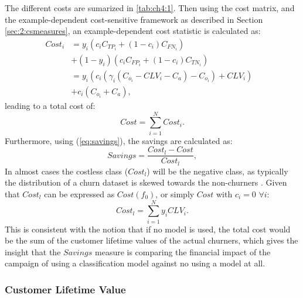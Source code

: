 The different costs are sumarized in \tablename{ \ref{tab:ch4:1}}.	Then using the cost 
matrix, and the example-dependent cost-sensitive framework as described in Section 
\ref{sec:2:csmeasures}, an example-dependent cost statistic is calculated as:
\begin{align}
  Cost_i &= y_i(c_i C_{TP_i} + (1-c_i)C_{FN_i})& \nonumber \\
         &  + (1-y_i)(c_i C_{FP_i} + (1-c_i)C_{TN_i})& \nonumber \\
         &= y_i(c_i\left(\gamma_i(C_{o_i}-CLV_i-C_a)-C_{o_i}\right)+CLV_i)&\nonumber \\
         & +c_i(C_{o_i}+C_a),&
	\end{align}
leading to a total cost of:
\begin{equation}
    Cost = \sum_{i=1}^N Cost_i.
\end{equation}
Furthermore, using (\ref{eq:savings}), the savings are calculated as:
\begin{equation}
  Savings = \frac{Cost_l - Cost}{Cost_l},
\end{equation} 
In almost cases the costless class ($Cost_l$) will be the negative class, as typically the 
distribution of a churn dataset is skewed towards the non-churners \citep{Verbeke2012}. Given that 
$Cost_l$ can be expressed as $Cost(f_0)$, or simply $Cost$ with $c_i=0$ $\forall i$:
\begin{equation}
 Cost_l = \sum_{i=1}^{N} y_i CLV_i.
\end{equation}
This is consistent with the notion that if no model is used, the total cost would be the 
sum of the customer lifetime values of the actual churners, which gives the insight 
that the $Savings$ measure is comparing the financial impact of the campaign of using a 
classification model against no using a model at all.


\subsubsection{Customer Lifetime Value}

